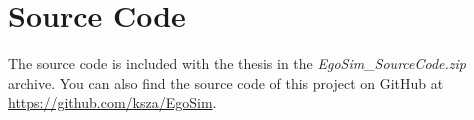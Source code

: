 \chapter{Source Code}\label{ch:source_code}
The source code is included with the thesis in the \emph{EgoSim\_SourceCode.zip} archive. You can also find the source code of this project on GitHub at \url{https://github.com/ksza/EgoSim}.